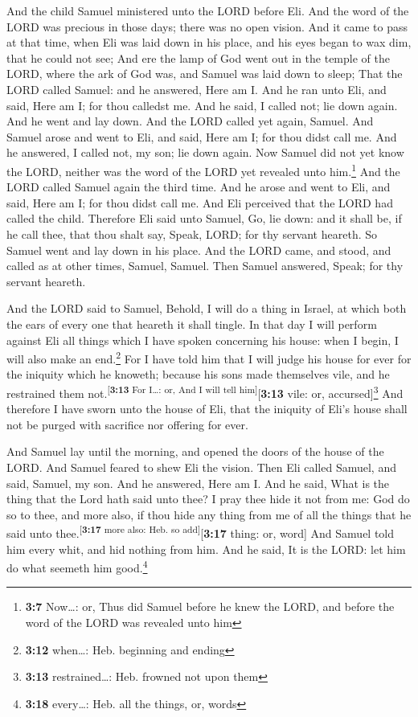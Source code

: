  And the child Samuel ministered unto the LORD before Eli.
And the word of the LORD was precious in those days; there was no open
vision.  And it came to pass at that time, when Eli was
laid down in his place, and his eyes began to wax dim, that he could not
see;  And ere the lamp of God went out in the temple of
the LORD, where the ark of God was, and Samuel was laid down to sleep;
 That the LORD called Samuel: and he answered, Here am I.
 And he ran unto Eli, and said, Here am I; for thou
calledst me. And he said, I called not; lie down again. And he went and
lay down.  And the LORD called yet again, Samuel. And
Samuel arose and went to Eli, and said, Here am I; for thou didst call
me. And he answered, I called not, my son; lie down again.
 Now Samuel did not yet know the LORD, neither was the
word of the LORD yet revealed unto him.\footnote{\textbf{3:7} Now\ldots:
  or, Thus did Samuel before he knew the LORD, and before the word of
  the LORD was revealed unto him}  And the LORD called
Samuel again the third time. And he arose and went to Eli, and said,
Here am I; for thou didst call me. And Eli perceived that the LORD had
called the child.  Therefore Eli said unto Samuel, Go, lie
down: and it shall be, if he call thee, that thou shalt say, Speak,
LORD; for thy servant heareth. So Samuel went and lay down in his place.
 And the LORD came, and stood, and called as at other
times, Samuel, Samuel. Then Samuel answered, Speak; for thy servant
heareth.

 And the LORD said to Samuel, Behold, I will do a thing
in Israel, at which both the ears of every one that heareth it shall
tingle.  In that day I will perform against Eli all
things which I have spoken concerning his house: when I begin, I will
also make an end.\footnote{\textbf{3:12} when\ldots: Heb. beginning and
  ending}  For I have told him that I will judge his
house for ever for the iniquity which he knoweth; because his sons made
themselves vile, and he restrained them
not.\textsuperscript{{[}\textbf{3:13} For I\ldots: or, And I will tell
him{]}}{[}\textbf{3:13} vile: or, accursed{]}\footnote{\textbf{3:13}
  restrained\ldots: Heb. frowned not upon them}  And
therefore I have sworn unto the house of Eli, that the iniquity of Eli's
house shall not be purged with sacrifice nor offering for ever.

 And Samuel lay until the morning, and opened the doors
of the house of the LORD. And Samuel feared to shew Eli the vision.
 Then Eli called Samuel, and said, Samuel, my son. And he
answered, Here am I.  And he said, What is the thing that
the Lord hath said unto thee? I pray thee hide it not from me: God do so
to thee, and more also, if thou hide any thing from me of all the things
that he said unto thee.\textsuperscript{{[}\textbf{3:17} more also: Heb.
so add{]}}{[}\textbf{3:17} thing: or, word{]}  And Samuel
told him every whit, and hid nothing from him. And he said, It is the
LORD: let him do what seemeth him good.\footnote{\textbf{3:18}
  every\ldots: Heb. all the things, or, words}

